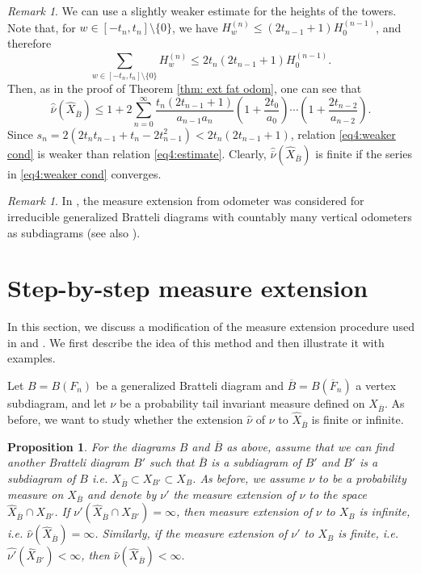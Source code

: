 \documentclass[11pt,reqno]{amsart}
\theoremstyle{definition}
\theoremstyle{remark}
\newtheorem{remark}[definition]{Remark}
\theoremstyle{plain}
\newtheorem{prop}[definition]{Proposition}
\def\ol{\overline}
\def\ov{\overline}
\def\wh{\widehat}
\newcommand{\be}{\begin{equation}}
\newcommand{\ee}{\end{equation}}
\numberwithin{equation}{section}
\begin{document}
\begin{remark}
We can use a slightly weaker estimate for the heights of the towers.
Note that, for $w \in [-t_n, t_n] \setminus \{0\}$, we have
$H_w^{(n)} \leq (2t_{n-1} + 1)H^{(n-1)}_0$, and therefore
$$
\sum_{w \in [-t_n, t_n] \setminus \{0\}} H_w^{(n)} \leq  
2t_n (2t_{n-1} + 1)H^{(n-1)}_0.
$$
Then, as in the proof of Theorem \ref{thm: ext fat odom}, one can see that 
\be\label{eq4:weaker cond}
\wh{\ol \nu}(\wh X_{\ov B}) \leq 
1 + 2\sum_{n = 0}^{\infty} \frac{t_n(2t_{n-1} + 1)}{a_{n-1}a_n}\left(1 + \frac{2t_0}{a_0}\right)\cdots \left(1 + \frac{2t_{n-2}}{a_{n-2}}\right).
\ee
Since $s_n = 2(2 t_nt_{n-1} + t_n - 2t^2_{n-1}) < 2t_n(2t_{n-1} + 1)$,
relation \eqref{eq4:weaker cond} is weaker than relation \eqref{eq4:estimate}. Clearly, $\wh{\ol \nu}(\wh X_{\ov B})$ is finite if the series in \eqref{eq4:weaker cond} converges. 
\end{remark}


\begin{remark}
In \cite[Section 4]{BezuglyiJorgensenKarpelKwiatkowski2025}, the measure extension from odometer was considered for irreducible generalized Bratteli diagrams with countably many vertical odometers as subdiagrams (see also ). 
\end{remark}

\section{Step-by-step measure extension}\label{sect step-by-step}

In this section, we discuss a modification of the measure extension procedure used in  and 
. We first describe the idea of this method and then illustrate it with examples. 

Let $B = B(F_n)$ be a generalized Bratteli diagram and $\ol B = B(\ol F_n)$ a vertex subdiagram, and let $\nu$ be a probability tail invariant measure defined on $X_{\ol B}$. As before, we want to study whether the extension $\wh\nu$ of $\nu$ to 
$\wh X_{\ol B}$ is finite or infinite.  

\begin{prop}\label{prop step-by-step}
For the diagrams $B$ and $\ol B$ as above, assume that we can find 
another Bratteli diagram $B'$ such that $\ol B$ is a subdiagram of
$B'$ and $B'$ is a subdiagram of $B$ i.e. $X_{\ol B} \subset X_{B'} \subset X_{B}$. As before, we assume $\nu$ to be a probability measure on $X_{\ol B}$ and denote by $\nu'$ the measure extension of $\nu$ to the space $\wh X_{\ol B} \cap X_{B'}$. 
If $\nu'(\wh X_{\ol B} \cap X_{B'}) = \infty$, then measure extension of $\nu$ to $X_B$ is infinite, i.e. $\wh\nu(\wh X_{\ol B}) = \infty$. Similarly, if the measure extension of $\nu'$ to $X_B$ is finite, i.e. $\wh{\nu'}(\wh X_{B'}) < \infty$, then $\wh\nu(\wh X_{\ol B}) < \infty.$
\end{prop}
\end{document}
